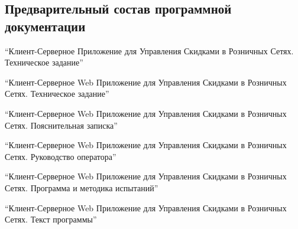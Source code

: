 \subsection{Предварительный состав программной документации}
\begin{my_enumerate}
    \item ``Клиент-Серверное Приложение для Управления Скидками в Розничных Сетях. Техническое задание''
    \item ``Клиент-Серверное Web Приложение для Управления Скидками в Розничных Сетях. Техническое 
    задание''
    \item ``Клиент-Серверное Web Приложение для Управления Скидками в Розничных Сетях. Пояснительная 
    записка''
    \item ``Клиент-Серверное Web Приложение для Управления Скидками в Розничных Сетях. 
    Руководство оператора''
    \item ``Клиент-Серверное Web Приложение для Управления Скидками в Розничных Сетях. Программа и
    методика испытаний''
    \item ``Клиент-Серверное Web Приложение для Управления Скидками в Розничных Сетях. Текст программы''
\end{my_enumerate}

